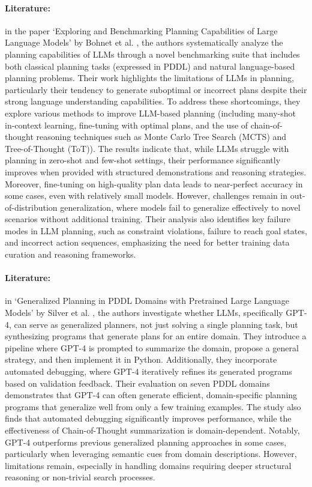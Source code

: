 \paragraph{Literature:}
in the paper `Exploring and Benchmarking Planning Capabilities of Large Language
Models' by Bohnet et al. \cite{bohnet2024exploringbenchmarkingplanningcapabilities},
the authors systematically analyze the planning capabilities of LLMs through a
novel benchmarking suite that includes both classical planning tasks (expressed in
PDDL) and natural language-based planning problems. Their work highlights the limitations
of LLMs in planning, particularly their tendency to generate suboptimal or
incorrect plans despite their strong language understanding capabilities. To address
these shortcomings, they explore various methods to improve LLM-based planning (including
many-shot in-context learning, fine-tuning with optimal plans, and the use of chain-of-thought
reasoning techniques such as Monte Carlo Tree Search (MCTS) and Tree-of-Thought (ToT)).
The results indicate that, while LLMs struggle with planning in zero-shot and
few-shot settings, their performance significantly improves when provided with structured
demonstrations and reasoning strategies. Moreover, fine-tuning on high-quality plan
data leads to near-perfect accuracy in some cases, even with relatively small
models. However, challenges remain in out-of-distribution generalization, where models
fail to generalize effectively to novel scenarios without additional training.
Their analysis also identifies key failure modes in LLM planning, such as constraint
violations, failure to reach goal states, and incorrect action sequences,
emphasizing the need for better training data curation and reasoning frameworks.

\paragraph{Literature:}
in `Generalized Planning in PDDL Domains with Pretrained Large Language Models' by
Silver et al. \cite{silver2023generalizedplanningpddldomains}, the authors investigate
whether LLMs, specifically GPT-4, can serve as generalized planners, not just
solving a single planning task, but synthesizing programs that generate plans for
an entire domain. They introduce a pipeline where GPT-4 is prompted to summarize
the domain, propose a general strategy, and then implement it in Python. Additionally,
they incorporate automated debugging, where GPT-4 iteratively refines its generated
programs based on validation feedback. Their evaluation on seven PDDL domains
demonstrates that GPT-4 can often generate efficient, domain-specific planning programs
that generalize well from only a few training examples. The study also finds
that automated debugging significantly improves performance, while the effectiveness
of Chain-of-Thought summarization is domain-dependent. Notably, GPT-4 outperforms
previous generalized planning approaches in some cases, particularly when
leveraging semantic cues from domain descriptions. However, limitations remain, especially
in handling domains requiring deeper structural reasoning or non-trivial search processes.